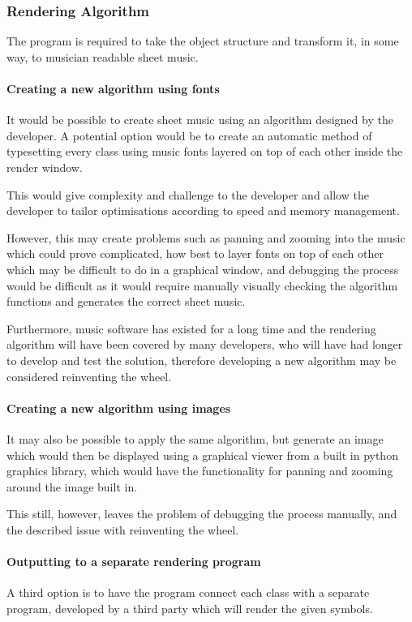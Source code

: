 \subsubsection{Rendering Algorithm}
The program is required to take the object structure and transform it, in some way, to musician readable sheet music. 

\paragraph{Creating a new algorithm using fonts}
It would be possible to create sheet music using an algorithm designed by the developer. A potential option would be to create an automatic method of typesetting every class using music fonts layered on top of each other inside the render window.

This would give complexity and challenge to the developer and allow the developer to tailor optimisations according to speed and memory management.

However, this may create problems such as panning and zooming into the music which could prove complicated, how best to layer fonts on top of each other which may be difficult to do in a graphical window, and debugging the process would be difficult as it would require manually visually checking the algorithm functions and generates the correct sheet music.

Furthermore, music software has existed for a long time and the rendering algorithm will have been covered by many developers, who will have had longer to develop and test the solution, therefore developing a new algorithm may be considered reinventing the wheel.

\paragraph{Creating a new algorithm using images}
It may also be possible to apply the same algorithm, but generate an image which would then be displayed using a graphical viewer from a built in python graphics library, which would have the functionality for panning and zooming around the image built in. 

This still, however, leaves the problem of debugging the process manually, and the described issue with reinventing the wheel.

\paragraph{Outputting to a separate rendering program}
A third option is to have the program connect each class with a separate program, developed by a third party which will render the given symbols.

